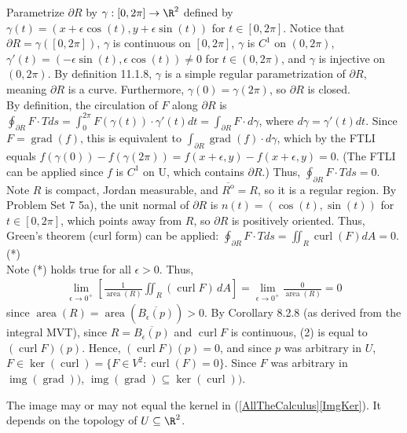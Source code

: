 \documentclass{exam}
\DeclareMathOperator{\Img}{img} %
\DeclareMathOperator{\Ker}{ker} %
\DeclareMathOperator{\Area}{area} %
\DeclareMathOperator{\Grad}{grad} %
\DeclareMathOperator{\Curl}{curl} %
\begin{document}
\begin{questions}
\begin{parts}
\begin{answer}{470pt}
Parametrize $\partial R$ by $\gamma:[0,2\pi] \to \R^2$ defined by $\gamma(t)=(x+\epsilon\cos(t),y+\epsilon\sin(t))$ for $t\in[0,2\pi]$. Notice that $\partial R=\gamma([0,2\pi])$, $\gamma$ is continuous on $[0,2\pi]$, $\gamma$ is $C^1$ on $(0,2\pi)$, $\gamma '(t)=(-\epsilon\sin(t),\epsilon\cos(t))\neq0$ for $t\in(0,2\pi)$, and $\gamma$ is injective on $(0,2\pi)$. By definition 11.1.8, $\gamma$ is a simple regular parametrization of $\partial R$, meaning $\partial R$ is a curve. Furthermore, $\gamma(0)=\gamma(2\pi)$, so $\partial R$ is closed.\\

By definition, the circulation of $F$ along $\partial R$ is $\oint_{\partial R} F\cdot Tds=\int_0^{2\pi} F(\gamma(t))\cdot\gamma'(t)dt=\int_{\partial R} F\cdot d\gamma$, where $d\gamma=\gamma'(t)dt$. Since $F=\Grad(f)$, this is equivalent to $\int_{\partial R} \Grad(f)\cdot d\gamma$, which by the FTLI equals $f(\gamma(0))-f(\gamma(2\pi))=f(x+\epsilon,y)-f(x+\epsilon,y)=0$. (The FTLI can be applied since $f$ is $C^1$ on U, which contains $\partial R$.) Thus, $\oint_{\partial R} F\cdot Tds=0$.\\

Note $R$ is compact, Jordan measurable, and $\overline{R^{\mathrm{o}}}=R$, so it is a regular region. By Problem Set 7 5a), the unit normal of $\partial R$ is $n(t)=(\cos(t),\sin(t))$ for $t\in[0,2\pi]$, which points away from $R$, so $\partial R$ is positively oriented. Thus, Green's theorem (curl form) can be applied: $\oint_{\partial R} F\cdot Tds=\iint_{R} \Curl(F) dA=0$. (*)\\

Note (*) holds true for all $\epsilon>0$. Thus, \begin{align}
    \lim_{\epsilon \to 0^+} \left[ \frac{1}{\Area(R)} \iint_R (\Curl F) \, dA \right] = \lim_{\epsilon \to 0^+} \frac{0}{\Area(R)}=0
\end{align}since $\Area(R)=\Area(\overline{B_{\epsilon}(p)})>0$. By Corollary 8.2.8 (as derived from the integral MVT), since $R=\overline{B_{\epsilon}(p)}$ and $\Curl F$ is continuous, (2) is equal to $(\Curl F)(p)$. Hence, $(\Curl F)(p)=0$, and since $p$ was arbitrary in $U$, $F\in\Ker(\Curl)=\{F\in V^2:\Curl(F)=0\}$. Since $F$ was arbitrary in $\Img(\Grad))$, $\Img(\Grad)\subseteq\Ker(\Curl))$.
\end{answer}	
	
	
	\pagebreak
	\item The image may or may not equal the kernel in (\ref{AllTheCalculus}\ref{ImgKer}). It depends on the topology of $U \subseteq \R^2$.  
	

\end{parts}
\end{questions}
\end{document}
